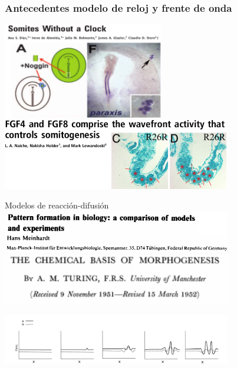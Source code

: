 \documentclass[xcolor=table, xllnames]{beamer}
\begin{document}
\begin{frame}
	\frametitle{Antecedentes modelo de reloj y frente de onda}
	\centering %
	\includegraphics[width=7cm]{Figuras/antecedentesFO2.png} \\
	\pause
	\includegraphics[width=10cm]{Figuras/antecedentesFO1.png}
	
\end{frame}
\begin{frame}{Modelos de reacción-difusión}
	\centering
	\includegraphics[width=10cm]{Figuras/Meinhardt.png}
	\includegraphics[width=10cm]{Figuras/turing.png} \\[.3cm]

	\pause
	
	\includegraphics[width=10cm]{Figuras/explicacionRD}
\end{frame}
\end{document}
